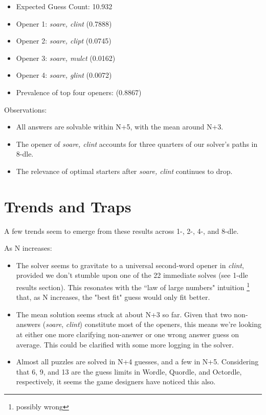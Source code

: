 \documentclass[11pt, oneside]{article} 	%
\begin{document}
\begin{itemize}
\item Expected Guess Count: 10.932
\item Opener 1: \emph{soare, clint} (0.7888)
\item Opener 2: \emph{soare, clipt} (0.0745)
\item Opener 3: \emph{soare, mulct} (0.0162)
\item Opener 4: \emph{soare, glint} (0.0072)
\item Prevalence of top four openers: (0.8867)
\end{itemize}

Observations: 
\begin{itemize}
\item All answers are solvable within N+5, with the mean around N+3. 
\item The opener of \emph{soare, clint} accounts for three quarters of our solver's paths in 8-dle.
\item The relevance of optimal starters after \emph{soare, clint} continues to drop. 
\end{itemize}

\section{Trends and Traps}

A few trends seem to emerge from these results across 1-, 2-, 4-, and 8-dle. 

As N increases:
\begin{itemize}
\item The solver seems to gravitate to a universal second-word opener in \emph{clint}, provided we don't stumble upon one of the 22 immediate solves (see 1-dle results section). This resonates with the ``law of large numbers" intuition \footnote{possibly wrong} that, as N increases, the "best fit" guess would only fit better.
\item The mean solution seems stuck at about N+3 so far. Given that two non-answers (\emph{soare}, \emph{clint}) constitute most of the openers, this means we're looking at either one more clarifying non-answer or one wrong answer guess on average. This could be clarified with some more logging in the solver.
\item Almost all puzzles are solved in N+4 guesses, and a few in N+5. Considering that 6, 9, and 13 are the guess limits in Wordle, Quordle, and Octordle, respectively, it seems the game designers have noticed this also.
\end{itemize}
 
\end{document}
